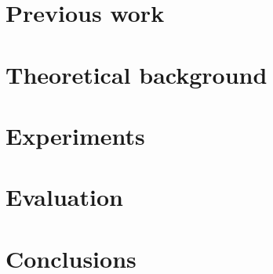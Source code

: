 \documentclass[a4paper,times,numbered,print,index, table, xcdraw]{article}
\begin{document}
\section{Previous work}
\label{chap:previous}


\section{Theoretical background}
\label{chap:theory}


\section{Experiments}
\label{chap:experiments}


\section{Evaluation}
\label{chap:evaluation}


\section{Conclusions}
\label{chap:conclusions}


\pagebreak
\appendix


\pagebreak


\end{document}
